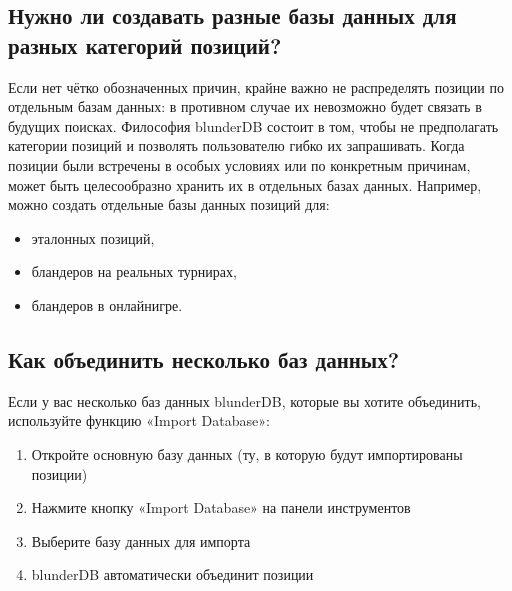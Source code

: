 \documentclass[letterpaper,10pt,russian]{sphinxmanual}
\begin{document}
\subsection{Нужно ли создавать разные базы данных для разных категорий позиций?}
\label{\detokenize{faq:dois-je-creer-differentes-bases-de-donnees-pour-differentes-categories-de-positions}}
\sphinxAtStartPar
Если нет чётко обозначенных причин, крайне важно не распределять позиции по отдельным базам данных: в противном случае их невозможно будет связать в будущих поисках. Философия blunderDB состоит в том, чтобы не предполагать категории позиций  и позволять пользователю гибко их запрашивать. Когда позиции были встречены в особых условиях или по конкретным причинам, может быть целесообразно хранить их в отдельных базах данных. Например, можно создать отдельные базы данных позиций для:
\begin{itemize}
\item {} 
\sphinxAtStartPar
эталонных позиций,

\item {} 
\sphinxAtStartPar
бландеров на реальных турнирах,

\item {} 
\sphinxAtStartPar
бландеров в онлайн\sphinxhyphen{}игре.

\end{itemize}


\subsection{Как объединить несколько баз данных?}
\label{\detokenize{faq:comment-fusionner-plusieurs-bases-de-donnees}}
\sphinxAtStartPar
Если у вас несколько баз данных blunderDB, которые вы хотите объединить, используйте функцию «Import Database»:
\begin{enumerate}
%
\item {} 
\sphinxAtStartPar
Откройте основную базу данных (ту, в которую будут импортированы позиции)

\item {} 
\sphinxAtStartPar
Нажмите кнопку «Import Database» на панели инструментов

\item {} 
\sphinxAtStartPar
Выберите базу данных для импорта

\item {} 
\sphinxAtStartPar
blunderDB автоматически объединит позиции

\end{enumerate}
\end{document}
